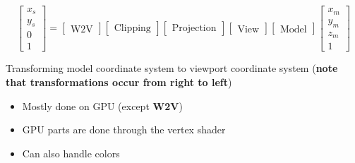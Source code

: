   \begin{equation}
    \begin{bmatrix}
      x_{s} \\
      y_{s} \\
      0 \\
      1
    \end{bmatrix}
    =
    \begin{bmatrix}
      \text{W2V}
    \end{bmatrix}
    \begin{bmatrix}
      \text{Clipping}
    \end{bmatrix}
    \begin{bmatrix}
      \text{Projection}
    \end{bmatrix}
    \begin{bmatrix}
      \text{View}
    \end{bmatrix}
    \begin{bmatrix}
      \text{Model}
    \end{bmatrix}
    \begin{bmatrix}
      x_{m} \\
      y_{m} \\
      z_{m} \\
      1
    \end{bmatrix}
  \end{equation}

  Transforming model coordinate system to viewport coordinate system
  (\textbf{note that transformations occur from right to left})

  \begin{itemize}
    \item Mostly done on GPU (except \textbf{W2V})
    \item GPU parts are done through the vertex shader
    \item Can also handle colors
  \end{itemize}

